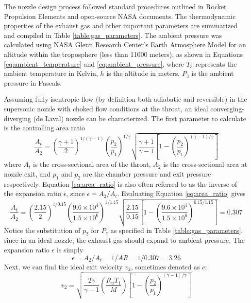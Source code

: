 \documentclass[9pt]{article} %
\numberwithin{equation}{section} %
\begin{document}
The nozzle design process followed standard procedures outlined in Rocket Propulsion Elements \cite{rpe} and open-source NASA documents. The thermodynamic properties of the exhaust gas and other important parameters are summarized and compiled in Table \ref{table:gas_parameters}. The ambient pressure was calculated using NASA Glenn Research Center's Earth Atmosphere Model for an altitude within the troposphere (less than 11000 meters), as shown in Equations \ref{eq:ambient_temperature} and \ref{eq:ambient_pressure}, where $T_{3}$ represents the ambient temperature in Kelvin, $h$ is the altitude in meters, $P_{3}$ is the ambient pressure in Pascals.

Assuming fully isentropic flow (by definition both adiabatic and reversible) in the supersonic nozzle with choked flow conditions at the throat, an ideal converging-diverging (de Laval) nozzle can be characterized. The first parameter to calculate is the controlling area ratio
\begin{equation} \label{eq:area_ratio}
\frac{A_{t}}{A_{2}} = \left( \frac{\gamma + 1}{2} \right) ^{1/(\gamma - 1)} \left( \frac{p_{2}}{p_{1}} \right) ^{1/\gamma} \sqrt{ \frac{\gamma + 1}{\gamma - 1} \left[ 1 - \left( \frac{p_{2}}{p_{1}} \right) ^{(\gamma - 1)/\gamma} \right] }
\end{equation}
where $A_{t}$ is the cross-sectional area of the throat, $A_{2}$ is the cross-sectional area at nozzle exit, and $p_{1}$ and $p_{2}$ are the chamber pressure and exit pressure respectively. Equation \ref{eq:area_ratio} is also often referred to as the inverse of the expansion ratio $\epsilon$, since $\epsilon = A_{2}/A_{t}$. Evaluating Equation \ref{eq:area_ratio} gives
\begin{equation*} 
\frac{A_{t}}{A_{2}} = \left( \frac{2.15}{2} \right) ^{1/0.15} \left( \frac{9.6 \times 10^{4}}{1.5 \times 10^{6}} \right) ^{1/1.15} \sqrt{ \frac{2.15}{0.15} \left[ 1 - \left( \frac{9.6 \times 10^{4}}{1.5 \times 10^{6}} \right) ^{0.15/1.15} \right] } = 0.307
\end{equation*}
Notice the substitution of $p_{2}$ for $P_{e}$ as specified in Table \ref{table:gas_parameters}, since in an ideal nozzle, the exhaust gas should expand to ambient pressure. The expansion ratio $\epsilon$ is simply
\begin{equation*}
\epsilon = A_{2}/A_{t} = 1/AR = 1/0.307 = 3.26
\end{equation*}
Next, we can find the ideal exit velocity $v_{2}$, sometimes denoted as $c$:
\begin{equation} \label{eq:exit_velocity}
v_{2} = \sqrt{ \frac{2\gamma}{\gamma - 1} \left( \frac{R_{u}T_{1}}{M} \right) \left[ 1- \left( \frac{p_{2}}{p_{1}} \right) ^{(\gamma - 1)/\gamma} \right] }
\end{equation}
\end{document}
